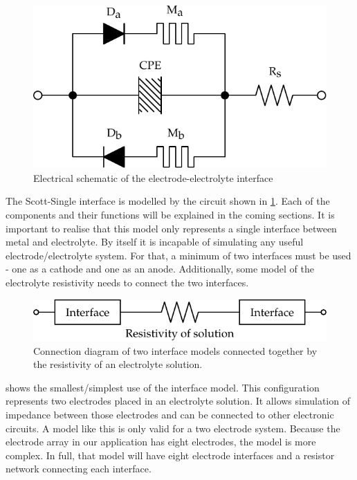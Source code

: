   \begin{figure}
    \centering
    \includegraphics{content/pt2/07-InterfaceModel/graphics/interfaceSchematic}
    \caption{\label{fig:pt2-interfaceSchematic}Electrical schematic of the electrode-electrolyte interface}
  \end{figure}

  The Scott-Single interface is modelled by the circuit shown in \cref{fig:pt2-interfaceSchematic}.
  Each of the components and their functions will be explained in the coming sections.
  It is important to realise that this model only represents a single interface between metal and electrolyte.
  By itself it is incapable of simulating any useful electrode/electrolyte system.
  For that, a minimum of two interfaces must be used - one as a cathode and one as an anode.
  Additionally, some model of the electrolyte resistivity needs to connect the two interfaces.

  \begin{figure}
    \centering
    \includegraphics{content/pt2/07-InterfaceModel/graphics/simpleElectrodeElectrolyteModel}
    \caption{\label{fig:pt2-simpleElectrodeElectrolyteModel}Connection diagram of two interface models connected together by the resistivity of an electrolyte solution.}
  \end{figure}

   shows the smallest/simplest use of the interface model.
  This configuration represents two electrodes placed in an electrolyte solution.
  It allows simulation of impedance between those electrodes and can be connected to other electronic circuits.
  A model like this is only valid for a two electrode system.
  Because the electrode array in our application has eight electrodes, the model is more complex.
  In full, that model will have eight electrode interfaces and a resistor network connecting each interface.






